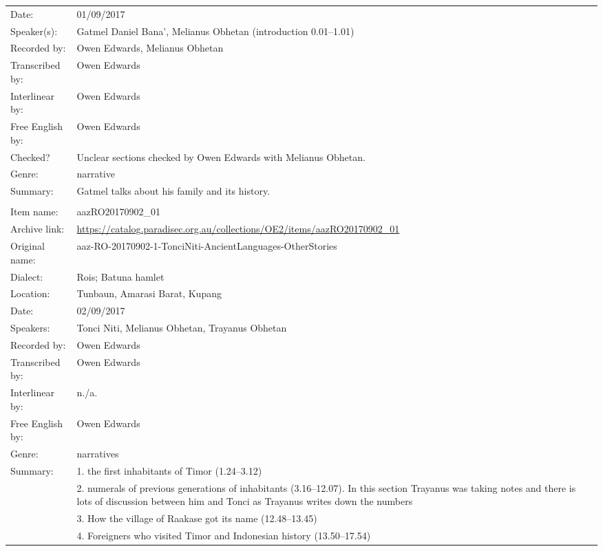 \begin{longtable}{lL{.67\textwidth}}
Date:								&	01/09/2017\\
Speaker(s):					& Gatmel Daniel Bana', Melianus Obhetan (introduction 0.01--1.01)\\
Recorded by: 				& Owen Edwards, Melianus Obhetan\\
Transcribed by:			& Owen Edwards\\
Interlinear by:			& Owen Edwards \\
Free English by:		& Owen Edwards\\
Checked?						& Unclear sections checked by Owen Edwards with Melianus Obhetan. \\
Genre:							& narrative\\
Summary:						& Gatmel talks about his family and its history.\\ \lspbottomrule
{}					& \\
Item name:			& aazRO20170902{\_}01\\
Archive link:		& \url{https://catalog.paradisec.org.au/collections/OE2/items/aazRO20170902_01}\\
Original name:	& {\footnotesize aaz-RO-20170902-1-TonciNiti-AncientLanguages-OtherStories}\\
Dialect:				& Ro{\Q}is; Batuna hamlet \\
Location:				& Tunbaun, Amarasi Barat, Kupang \\
Date:						& 02/09/2017\\
Speakers:				& Tonci Niti, Melianus Obhetan, Trayanus Obhetan\\
Recorded by:		& Owen Edwards\\
Transcribed by:	& Owen Edwards\\
Interlinear by:	& n./a.\\
Free English by:& Owen Edwards\\
Genre:					& narratives\\
Summary:				& 1. the first inhabitants of Timor (1.24--3.12)\\
								& 2. numerals of previous generations of inhabitants (3.16--12.07).
									In this section Trayanus was taking notes and there is lots of discussion
									between him and Tonci as Trayanus writes down the numbers \\
								& 3. How the village of Raakase got its name (12.48--13.45)\\
								& 4. Foreigners who visited Timor and Indonesian history (13.50--17.54)\\

\end{longtable}
